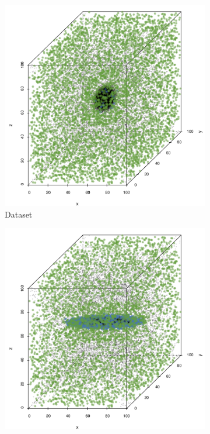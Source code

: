 \begin{figure}
\begin{subfigure}{0.23\textwidth}
				\includegraphics[keepaspectratio=true, width=\textwidth, height=0.23\textheight]{discussion/img/ferdosi_1_60000_anisotropy.png}
				\caption{Dataset \baakmanOne}
				\label{fig:discussion:anisotropy:baakman1}
			\end{subfigure}	
			\begin{subfigure}{0.23\textwidth}
				\centering
				\includegraphics[keepaspectratio=true, width=\textwidth, height=0.23\textheight]{discussion/img/baakman_4_60000_anisotropy.png}

\end{subfigure}
\end{figure}
